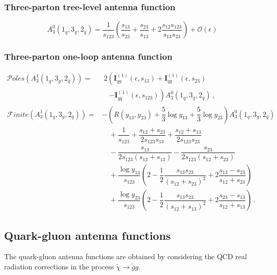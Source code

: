 \documentclass[main.tex]{subfiles}
\begin{document}
    \subsubsection{Three-parton tree-level antenna function}
    \begin{equation}\label{eqn:A30}
        A_{3}^{0}(1_{q}, 3_{g}, 2_{\bar{q}}) = \dfrac{1}{s_{123}}\left(\dfrac{s_{13}}{s_{23}} + \dfrac{s_{23}}{s_{13}} + 2\dfrac{s_{12}s_{123}}{s_{13}s_{23}}\right) + \mathcal{O}(\epsilon)
    \end{equation}

    \subsubsection{Three-parton one-loop antenna function}
    \begin{align}\label{eqn:A31}
        \mathcal{P}oles\left(A_{3}^{1}(1_{q}, 3_{g}, 2_{\bar{q}})\right) =& \; 2\left(\mathbf{I}_{qg}^{(1)}(\epsilon, s_{13}) + \mathbf{I}_{qg}^{(1)}(\epsilon, s_{23}) \right. \nonumber \\
        &\quad \left. -\mathbf{I}_{q\bar{q}}^{(1)}(\epsilon,s_{123})\right)A_{3}^{0}(1_{q},3_{g},2_{\bar{q}}) \, , \\
        \mathcal{F}inite\left(A_{3}^{1}(1_{q}, 3_{g}, 2_{\bar{q}})\right) =& -\left(R(y_{13}, y_{23}) + \dfrac{5}{3}\log{y_{13}}+\dfrac{5}{3}\log{y_{23}}\right)A_{3}^{0}(1_{q}, 3_{g}, 2_{\bar{q}}) \nonumber\\
        &\quad +\dfrac{1}{s_{123}} + \dfrac{s_{12}+s_{23}}{2s_{123}s_{13}} + \dfrac{s_{12}+s_{13}}{2s_{123}s_{23}} \nonumber \\
        &\quad -\dfrac{s_{13}}{2s_{123}(s_{12}+s_{13})}-\dfrac{s_{23}}{2s_{123}(s_{12}+s_{23})} \nonumber \\
        &\quad +\dfrac{\log{y_{13}}}{s_{123}}\left(2-\dfrac{1}{2}\dfrac{s_{13}s_{23}}{(s_{12}+s_{23})^{2}} + 2\dfrac{s_{13}-s_{23}}{s_{12}+s_{23}}\right) \nonumber  \\
        &\quad +\dfrac{\log{y_{23}}}{s_{123}}\left(2-\dfrac{1}{2}\dfrac{s_{13}s_{23}}{(s_{12}+s_{13})^{2}} + 2\dfrac{s_{23}-s_{13}}{s_{12}+s_{13}}\right) \, .
    \end{align}

    \subsection{Quark-gluon antenna functions}
    The quark-gluon antenna functions are obtained by considering
    the QCD real radiation corrections in the process $\tilde{\chi} \rightarrow \tilde{g} g$.
\end{document}
